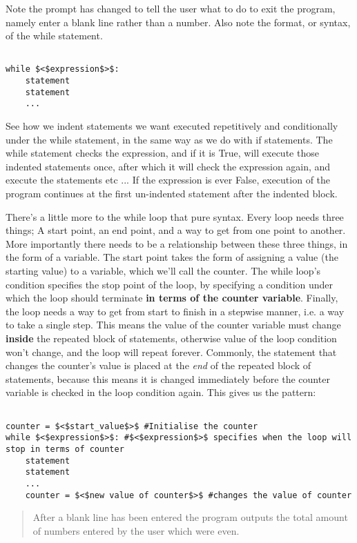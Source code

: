 Note the prompt has changed to tell the user what to do to exit the   program, namely enter a blank line rather than a number. Also note the   format, or syntax, of the while statement.
\begin{lstlisting}

while $<$expression$>$:
    statement
    statement
    ...
\end{lstlisting}

See how we indent statements we want executed repetitively and   conditionally under the while statement, in the same way as we do with   if statements. The while statement checks the expression, and if it is   True, will execute those indented statements once, after which it will   check the expression again, and execute the statements etc ... If the   expression is ever False, execution of the program continues at the   first un-indented statement after the indented block.

There's a little more to the while loop that pure syntax. Every   loop needs three things; A start point, an end point, and a way to get   from one point to another. More importantly there needs to be a   relationship between these three things, in the form of a variable. The   start point takes the form of assigning a value (the starting value) to   a variable, which we'll call the counter. The while loop's condition   specifies the stop point of the loop, by specifying a condition under   which the loop should terminate \textbf{in terms of the counter   variable}. Finally, the loop needs a way to get from start to   finish in a stepwise manner, i.e. a way to take a single step. This   means the value of the counter variable must change   \textbf{inside} the repeated block of statements, otherwise   value of the loop condition won't change, and the loop will repeat   forever. Commonly, the statement that changes the counter's   value is placed at the \textit{end} of the repeated block of   statements, because this means it is changed immediately before the   counter variable is checked in the loop condition again. This gives us   the pattern:
\begin{lstlisting}

counter = $<$start_value$>$ #Initialise the counter
while $<$expression$>$: #$<$expression$>$ specifies when the loop will stop in terms of counter
    statement
    statement
    ...
    counter = $<$new value of counter$>$ #changes the value of counter
\end{lstlisting}
\begin{quotation}     After a blank line has been entered the program outputs the total amount    of numbers entered by the user which were even.    
\end{quotation}

